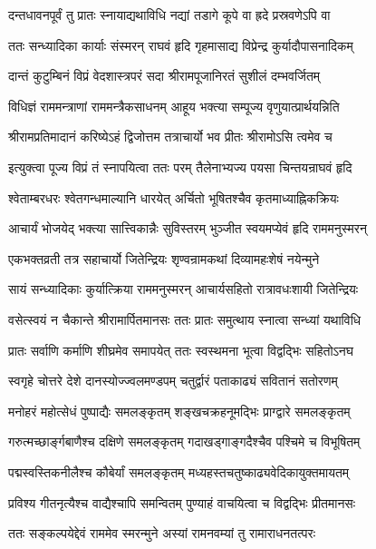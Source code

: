 \twolineshloka
{दन्तधावनपूर्वं तु प्रातः स्नायाद्यथाविधि}
{नद्यां तडागे कूपे वा ह्रदे प्रस्रवणेऽपि वा}%

\twolineshloka
{ततः सन्ध्यादिका कार्याः संस्मरन् राघवं हृदि}
{गृहमासाद्य विप्रेन्द्र कुर्यादौपासनादिकम्}%

\twolineshloka
{दान्तं कुटुम्बिनं विप्रं वेदशास्त्रपरं सदा}
{श्रीरामपूजानिरतं सुशीलं दम्भवर्जितम्}%

\twolineshloka
{विधिज्ञं राममन्त्राणां राममन्त्रैकसाधनम्}
{आहूय भक्त्या सम्पूज्य वृणुयात्प्रार्थयन्निति}%

\twolineshloka
{श्रीरामप्रतिमादानं करिष्येऽहं द्विजोत्तम}
{तत्राचार्यो भव प्रीतः श्रीरामोऽसि त्वमेव च}%

\twolineshloka
{इत्युक्त्वा पूज्य विप्रं तं स्नापयित्वा ततः परम्}
{तैलेनाभ्यज्य पयसा चिन्तयन्राघवं हृदि}%

\twolineshloka
{श्वेताम्बरधरः श्वेतगन्धमाल्यानि धारयेत्}
{अर्चितो भूषितश्चैव कृतमाध्याह्निकक्रियः}%

\twolineshloka
{आचार्यं भोजयेद् भक्त्या सात्त्विकान्नैः सुविस्तरम्}
{भुञ्जीत स्वयमप्येवं हृदि राममनुस्मरन्}%

\twolineshloka
{एकभक्तव्रती तत्र सहाचार्यो जितेन्द्रियः}
{शृण्वन्रामकथां दिव्यामहःशेषं नयेन्मुने}%

\twolineshloka
{सायं सन्ध्यादिकाः कुर्यात्क्रिया राममनुस्मरन्}
{आचार्यसहितो रात्रावधःशायी जितेन्द्रियः}%

\twolineshloka
{वसेत्स्वयं न चैकान्ते श्रीरामार्पितमानसः}
{ततः प्रातः समुत्थाय स्नात्वा सन्ध्यां यथाविधि}%

\twolineshloka
{प्रातः सर्वाणि कर्माणि शीघ्रमेव समापयेत्}
{ततः स्वस्थमना भूत्वा विद्वद्भिः सहितोऽनघ}%

\twolineshloka
{स्वगृहे चोत्तरे देशे दानस्योज्ज्वलमण्डपम्}%
{चतुर्द्वारं पताकाढ्यं सवितानं सतोरणम्}%

\twolineshloka
{मनोहरं महोत्सेधं पुष्पाद्यैः समलङ्कृतम्}
{शङ्खचक्रहनूमद्भिः प्राग्द्वारे समलङ्कृतम्}%

\twolineshloka
{गरुत्मच्छार्ङ्गबाणैश्च दक्षिणे समलङ्कृतम्}
{गदाखड्गाङ्गदैश्चैव पश्चिमे च विभूषितम्}%

\twolineshloka
{पद्मस्वस्तिकनीलैश्च कौबेर्यां समलङ्कृतम्}
{मध्यहस्तचतुष्काढ्यवेदिकायुक्तमायतम्}%

\twolineshloka
{प्रविश्य गीतनृत्यैश्च वाद्यैश्चापि समन्वितम्}
{पुण्याहं वाचयित्वा च विद्वद्भिः प्रीतमानसः}%

\twolineshloka
{ततः सङ्कल्पयेद्देवं राममेव स्मरन्मुने}
{अस्यां रामनवम्यां तु रामाराधनतत्परः}%

